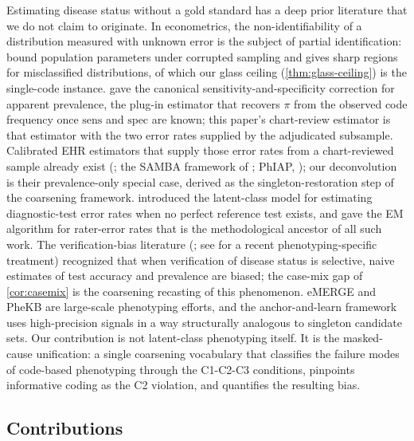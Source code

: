 Estimating disease status without a gold standard has a deep prior
literature that we do not claim to originate. In econometrics, the
non-identifiability of a distribution measured with unknown error is
the subject of partial identification: \citet{horowitz1995identification}
bound population parameters under corrupted sampling and
\citet{molinari2008partial} gives sharp regions for misclassified
distributions, of which our glass ceiling
(\cref{thm:glass-ceiling}) is the single-code instance.
\citet{rogan1978estimating} gave the canonical
sensitivity-and-specificity correction for apparent prevalence, the
plug-in estimator that recovers $\pi$ from the observed code
frequency once $\mathrm{sens}$ and $\mathrm{spec}$ are known; this
paper's chart-review estimator is that estimator with the two error
rates supplied by the adjudicated subsample. Calibrated EHR estimators
that supply those error rates from a chart-reviewed sample already
exist (\citealp{tong2020augmented}; the SAMBA framework of
\citealp{beesley2022samba}; PhIAP, \citealp{zhang2019phiap}); our
deconvolution is their prevalence-only special case, derived as the
singleton-restoration step of the coarsening framework. \citet{hui1980estimating}
introduced the latent-class model for estimating diagnostic-test error
rates when no perfect reference test exists, and
\citet{dawid1979maximum} gave the EM algorithm for rater-error rates
that is the methodological ancestor of all such work. The
verification-bias literature (\citealp{begg1983assessment}; see
\citealp{hubbard2020outcome} for a recent phenotyping-specific
treatment) recognized that when verification of disease status is
selective, naive estimates of test accuracy and prevalence are biased;
the case-mix gap of \cref{cor:casemix} is the coarsening recasting of
this phenomenon. eMERGE
\citep{gottesman2013emerge} and PheKB \citep{kirby2016phekb} are
large-scale phenotyping efforts, and the anchor-and-learn framework
\citep{halpern2016anchor} uses high-precision signals in a way
structurally analogous to singleton candidate sets. Our contribution
is not latent-class phenotyping itself. It is the masked-cause
unification: a single coarsening vocabulary that classifies the
failure modes of code-based phenotyping through the C1-C2-C3
conditions, pinpoints informative coding as the C2 violation, and
quantifies the resulting bias.

\subsection{Contributions}

